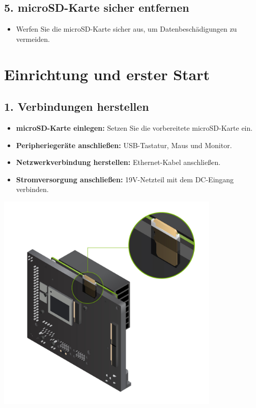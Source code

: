 \documentclass{article}
\begin{document}
\subsection{5. microSD-Karte sicher entfernen}
\begin{itemize}
    \item Werfen Sie die microSD-Karte sicher aus, um Datenbeschädigungen zu vermeiden.
\end{itemize}

\clearpage
\section{Einrichtung und erster Start}

\subsection{1. Verbindungen herstellen}
\begin{itemize}
    \item \textbf{microSD-Karte einlegen:} Setzen Sie die vorbereitete microSD-Karte ein.
    \item \textbf{Peripheriegeräte anschließen:} USB-Tastatur, Maus und Monitor.
    \item \textbf{Netzwerkverbindung herstellen:} Ethernet-Kabel anschließen.
    \item \textbf{Stromversorgung anschließen:} 19V-Netzteil mit dem DC-Eingang verbinden.
\end{itemize}
\begin{center}
    \includegraphics[width=0.8\textwidth ]{jetson-orin-nano-dev-kit-sd-slot.jpg}
\end{center}
\end{document}

